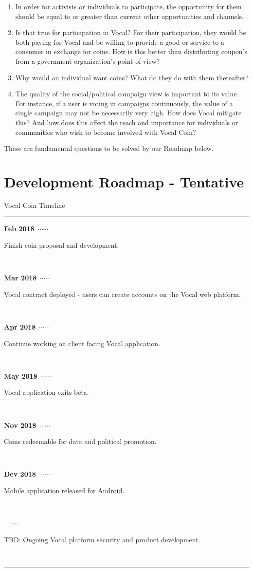 \documentclass[conference]{IEEEtran}
\begin{document}
    \begin{enumerate}
      \item In order for activists or individuals to participate, the opportunity for them should be equal to or greater than current other opportunities and channels.
      \item Is that true for participation in Vocal? For their participation, they would be both paying for Vocal and be willing to provide a good or service to a consumer in exchange for coins. How is this better than distributing coupon’s from a government organization’s point of view?
      \item Why would an individual want coins? What do they do with them thereafter?
      \item The quality of the social/political campaign view is important to its value. For instance, if a user is voting in campaigns continuously, the value of a single campaign may not be necessarily very high. How does Vocal mitigate this? And how does this affect the reach and importance for individuals or communities who wish to become involved with Vocal Coin?
    \end{enumerate}

    These are fundamental questions to be solved by our Roadmap below.
    
    \section{Development Roadmap - Tentative}


    \newcommand\ytl[2]{
    \parbox[b]{8em}{\hfill{\color{cyan}\bfseries\sffamily #1}~$\cdots\cdots$~}\makebox[0pt][c]{$\bullet$}\vrule\quad \parbox[c]{3cm}{\vspace{7pt}\color{red!40!black!80}\raggedright\sffamily #2.\\[7pt]}\\[-3pt]}
    \begin{table}
    \caption{Vocal Coin Timeline}
    \centering
    \begin{minipage}[t]{\linewidth}
    \color{gray}
    \rule{\linewidth}{1pt}
    \ytl{Feb 2018}{Finish coin proposal and development}
    \ytl{Mar 2018}{Vocal contract deployed - users can create accounts on the Vocal web platform}
    \ytl{Apr 2018}{Continue working on client facing Vocal application}
    \ytl{May 2018}{Vocal application exits beta}
    \ytl{Nov 2018}{Coins redeemable for data and political promotion}
    \ytl{Dev 2018}{Mobile application released for Android}
    \ytl{2019}{TBD: Ongoing Vocal platform security and product development}
    \bigskip
    \rule{\linewidth}{1pt}%
    \end{minipage}%
    \end{table}
\end{document}
